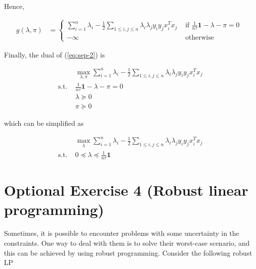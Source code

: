 \documentclass[a4paper, 11pt]{report}
\begin{document}
\begin{enumerate}
    Hence,
    
    \begin{equation*}
        \begin{aligned}
        g \left( \lambda, \pi \right) &= \begin{cases}
        \sum_{i=1}^{n} \lambda_{i} - \frac{1}{2} \sum_{1 \leq i, j \leq n} \lambda_{i} \lambda_{j} y_{i} y_{j} x_{i}^{T} x_{j} & \text{ if } \frac{1}{n \tau} \mathbf{1} - \lambda - \pi = 0 \\
        - \infty & \text{ otherwise }
        \end{cases}
        \end{aligned}
    \end{equation*}
    
    \pagebreak
    
    Finally, the dual of (\ref{eq:sep-2}) is
    
    \begin{equation*}
        \begin{aligned}
        & \max_{\lambda, \pi}  \sum_{i=1}^{n} \lambda_{i} - \frac{1}{2} \sum_{1 \leq i, j \leq n} \lambda_{i} \lambda_{j} y_{i} y_{j} x_{i}^{T} x_{j} \\
        \text{ s.t. } & \frac{1}{n \tau} \mathbf{1} - \lambda - \pi = 0 \\
        & \lambda \succeq 0 \\
        & \pi \succeq 0
        \end{aligned}
    \end{equation*}
    
    which can be simplified as
    
    \begin{equation*}
        \boxed{\begin{aligned}
        & \max_{\lambda}  \sum_{i=1}^{n} \lambda_{i} - \frac{1}{2} \sum_{1 \leq i, j \leq n} \lambda_{i} \lambda_{j} y_{i} y_{j} x_{i}^{T} x_{j} \\
        \text{ s.t. } & 0 \preceq \lambda \preceq \frac{1}{n \tau} \mathbf{1}
        \end{aligned}}
    \end{equation*}
\end{enumerate}

\section*{Optional Exercise 4 (Robust linear programming)}

Sometimes, it is possible to encounter problems with some uncertainty in the constraints. One way to deal with them is to solve their worst-case scenario, and this can be achieved by using robust programming. Consider the following robust LP
\end{document}
